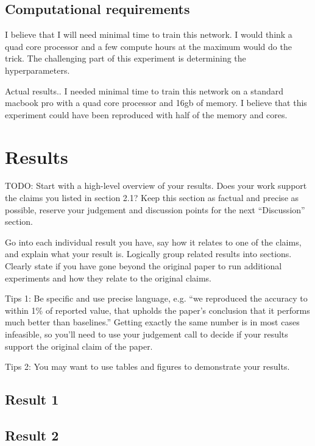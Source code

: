 \documentclass[11pt,a4paper]{article}
\begin{document}
\subsection{Computational requirements}

I believe that I will need minimal time to train this network. I would think a quad core processor and a few compute hours at the maximum would do the trick. The challenging part of this experiment is determining the hyperparameters.

Actual results..
I needed minimal time to train this network on a standard macbook pro with a quad core processor and 16gb of memory. I believe that this experiment could have been reproduced with half of the memory and cores.

\section{Results}
TODO: 
Start with a high-level overview of your results. Does your work support the claims you listed in section 2.1? Keep this section as factual and precise as possible, reserve your judgement and discussion points for the next ``Discussion'' section. 

Go into each individual result you have, say how it relates to one of the claims, and explain what your result is. Logically group related results into sections. Clearly state if you have gone beyond the original paper to run additional experiments and how they relate to the original claims. 

Tips 1: Be specific and use precise language, e.g. ``we reproduced the accuracy to within 1\% of reported value, that upholds the paper's conclusion that it performs much better than baselines.'' Getting exactly the same number is in most cases infeasible, so you'll need to use your judgement call to decide if your results support the original claim of the paper. 

Tips 2: You may want to use tables and figures to demonstrate your results.


\subsection{Result 1}

\subsection{Result 2}
\end{document}

